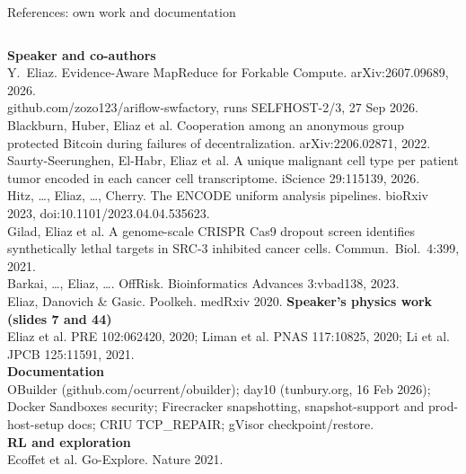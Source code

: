 \begin{frame}[t]{References: own work and documentation}
\vspace{0pt}
{\fontsize{7.0}{8.3}\selectfont
\begin{columns}[T,onlytextwidth]
\textbf{Speaker and co-authors}\\
Y.~Eliaz. Evidence-Aware MapReduce for Forkable Compute. arXiv:2607.09689, 2026.\\
github.com/zozo123/ariflow-swfactory, runs SELFHOST-2/3, 27 Sep 2026.\\
Blackburn, Huber, Eliaz et al. Cooperation among an anonymous group protected Bitcoin during failures of decentralization. arXiv:2206.02871, 2022.\\
Saurty-Seerunghen, El-Habr, Eliaz et al. A unique malignant cell type per patient tumor encoded in each cancer cell transcriptome. iScience 29:115139, 2026.\\
Hitz, \dots, Eliaz, \dots, Cherry. The ENCODE uniform analysis pipelines. bioRxiv 2023, doi:10.1101/2023.04.04.535623.\\
Gilad, Eliaz et al. A genome-scale CRISPR Cas9 dropout screen identifies synthetically lethal targets in SRC-3 inhibited cancer cells. Commun.\ Biol.\ 4:399, 2021.\\
Barkai, \dots, Eliaz, \dots. OffRisk. Bioinformatics Advances 3:vbad138, 2023.\\
Eliaz, Danovich \& Gasic. Poolkeh. medRxiv 2020.
\textbf{Speaker's physics work (slides 7 and 44)}\\
Eliaz et al. PRE 102:062420, 2020; Liman et al. PNAS 117:10825, 2020; Li et al. JPCB 125:11591, 2021.\\[4pt]
\textbf{Documentation}\\
OBuilder (github.com/ocurrent/obuilder); day10 (tunbury.org, 16 Feb 2026); Docker Sandboxes security; Firecracker snapshotting, snapshot-support and prod-host-setup docs; CRIU TCP\_REPAIR; gVisor checkpoint/restore.\\[4pt]
\textbf{RL and exploration}\\
Ecoffet et al. Go-Explore. Nature 2021.
\end{columns}\par}
\end{frame}

